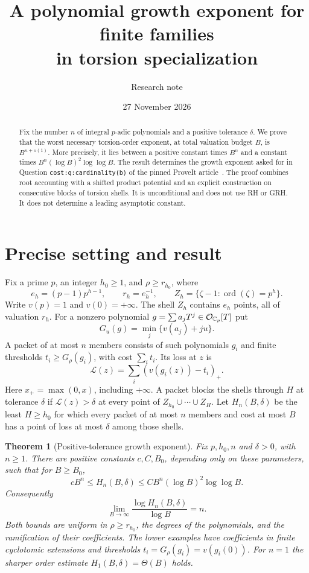 \documentclass[11pt]{article}
\title{A polynomial growth exponent for finite families\protect\\in torsion specialization}
\author{Research note}
\date{27 November 2026}
\newtheorem{theorem}{Theorem}
\theoremstyle{remark}\newtheorem{remark}[theorem]{Remark}
\newcommand{\pos}[1]{\left(#1\right)_+}
\begin{document}
\maketitle
\begin{abstract}
Fix the number $n$ of integral $p$-adic polynomials and a positive tolerance $\delta$.
We prove that the worst necessary torsion-order exponent, at total valuation budget $B$,
is $B^{n+o(1)}$. More precisely, it lies between a positive constant times $B^n$ and a
constant times $B^n(\log B)^2\log\log B$. The result determines the growth exponent
asked for in Question \texttt{cost:q:cardinality(b)} of the pinned ProveIt article~\cite{proveit-cost}.
The proof combines root accounting with a shifted product potential and an explicit
construction on consecutive blocks of torsion shells. It is unconditional and does
not use RH or GRH. It does not determine a leading asymptotic constant.
\end{abstract}

\section{Precise setting and result}
Fix a prime $p$, an integer $h_0\ge1$, and $\rho\ge r_{h_0}$, where
\[
 e_h=(p-1)p^{h-1},\qquad r_h=e_h^{-1},\qquad
 Z_h=\{\zeta-1:\operatorname{ord}(\zeta)=p^h\}.
\]
Write $v(p)=1$ and $v(0)=+\infty$. The shell $Z_h$ contains $e_h$ points, all of
valuation $r_h$. For a nonzero polynomial $g=\sum a_jT^j\in\mathcal O_{\mathbb C_p}[T]$ put
\[
 G_u(g)=\min_j\{v(a_j)+ju\}.
\]
A packet of at most $n$ members consists of such polynomials $g_i$ and finite thresholds
$t_i\ge G_\rho(g_i)$, with cost $\sum_i t_i$. Its loss at $z$ is
\[
 \mathcal L(z)=\sum_i\pos{v(g_i(z))-t_i}.
\]
Here $x_+=\max(0,x)$, including $+\infty$. A packet blocks the shells through $H$ at
tolerance $\delta$ if $\mathcal L(z)>\delta$ at every point of
$Z_{h_0}\cup\cdots\cup Z_H$.
Let $H_n(B,\delta)$ be the least $H\ge h_0$ for which every packet of at most $n$ members
and cost at most $B$ has a point of loss at most $\delta$ among those shells.

\begin{theorem}[Positive-tolerance growth exponent]\label{thm:main}
Fix $p,h_0,n$ and $\delta>0$, with $n\ge1$. There are positive constants $c,C,B_0$,
depending only on these parameters, such that for $B\ge B_0$,
\[
 cB^n\le H_n(B,\delta)
 \le C B^n(\log B)^2\log\log B.
\]
Consequently
\[
 \lim_{B\to\infty}\frac{\log H_n(B,\delta)}{\log B}=n.
\]
Both bounds are uniform in $\rho\ge r_{h_0}$, the degrees of the polynomials, and
the ramification of their coefficients. The lower examples have coefficients in
finite cyclotomic extensions and thresholds $t_i=G_\rho(g_i)=v(g_i(0))$.
For $n=1$ the sharper order estimate $H_1(B,\delta)=\Theta(B)$ holds.
\end{theorem}
\end{document}
